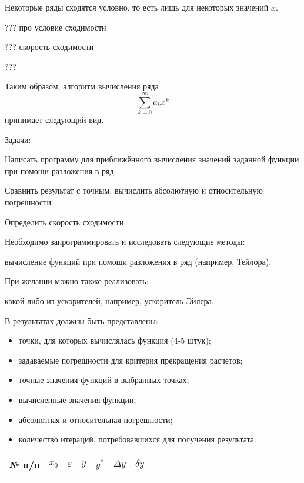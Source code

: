 Некоторые ряды сходятся условно, то есть лишь для некоторых значений
$x$.

??? про условие сходимости

??? скорость сходимости

\Practice


???

Таким образом, алгоритм вычисления ряда
\[
\sum_{k=0}^{\infty}a_{k}x^{k}
\]
принимает следующий вид.


%
%

\Tasks

Задачи:

Написать программу для приближённого вычисления значений заданной
функции при помощи разложения в ряд.

Сравнить результат с точным, вычислить абсолютную и относительную
погрешности.

Определить скорость сходимости.

Необходимо запрограммировать и исследовать следующие методы:

вычисление функций при помощи разложения в ряд (например, Тейлора).

При желании можно также реализовать:

какой-либо из ускорителей, например, ускоритель Эйлера.

В результатах должны быть представлены:
\begin{itemize}
\item точки, для которых вычислялась функция (4-5 штук);
\item задаваемые погрешности для критерия прекращения расчётов;
\item точные значения функций в выбранных точках;
\item вычисленные значения функции;
\item абсолютная и относительная погрешности;
\item количество итераций, потребовавшихся для получения результата.
\end{itemize}

\begin{center}
  \begin{tabular}{|c|c|c|c|c|c|c|}
    \hline 
    № п/п & $x_{0}$ & $\varepsilon$ & $y$ & $y^{*}$ & $\Delta y$ & $\delta y$\tabularnewline
    \hline 
    \hline 
    &  &  &  &  &  & \tabularnewline
    \hline 
  \end{tabular}
  \par
\end{center}
  
